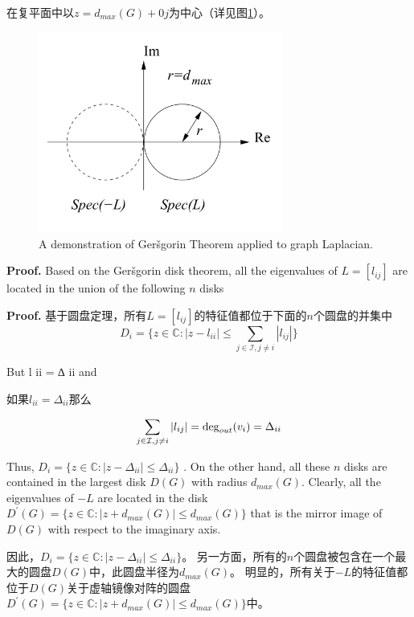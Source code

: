 \documentclass{article}
\begin{document}
\noindent 在复平面中以$z=d_{max}(G)+0j$为中心（详见图\ref{DiskTheorem}）。

\begin{figure}[htbp]
    \centering
    \includegraphics[width=8cm]{figures/Fig1-DiskTheorem.jpeg}
    \caption{A demonstration of Ger\v sgorin Theorem applied to graph Laplacian.}
    \label{DiskTheorem}
\end{figure}

{\color[gray]{0.5}
\noindent \textbf{Proof.}  Based on the Ger\v sgorin disk theorem, all the eigenvalues of $L=[l_{ij}]$ are located in the union of the following $n$ disks
}

\noindent \textbf{Proof.} 基于圆盘定理，所有$L=[l_{ij}]$的特征值都位于下面的$n$个圆盘的并集中
\begin{equation}
    D_i = \{ z\in \mathbb{C}: |z-l_{ii}| \le \sum_{j\in \mathcal{I},j\ne i}|l_{ij}| \}
    \tag{16}
    \label{16}
\end{equation}

{\color[gray]{0.5}
But l ii = ∆ ii and
}

如果$l_{ii} = \Delta_{ii}$那么

\begin{equation}
    \sum_{j\in \mathcal{I},j\ne i}|l_{ij}|=\deg_{out}(v_i) = \Delta_{ii}
    \notag
\end{equation}

{\color[gray]{0.5}
\noindent Thus, $D_i = \{ z\in \mathbb{C}:|z - \Delta_{ii}| \le \Delta_{ii}\}$ . 
On the other hand, all these $n$ disks are contained in the largest disk $D(G)$ with radius $d_{max}(G)$. 
Clearly, all the eigenvalues of $−L$ are located in the disk $D^\prime(G)=\{ z\in \mathbb{C}: |z+d_{max}(G)|\le d_{max}(G)\}$ that is the mirror image of $D(G)$ with respect to the imaginary axis.
}

\noindent 因此，$D_i = \{ z\in \mathbb{C}:|z - \Delta_{ii}| \le \Delta_{ii}\}$。
另一方面，所有的$n$个圆盘被包含在一个最大的圆盘$D(G)$中，此圆盘半径为$d_{max}(G)$。
明显的，所有关于$-L$的特征值都位于$D(G)$关于虚轴镜像对阵的圆盘$D^\prime(G)=\{ z\in \mathbb{C}: |z+d_{max}(G)|\le d_{max}(G)\}$中。
\end{document}
